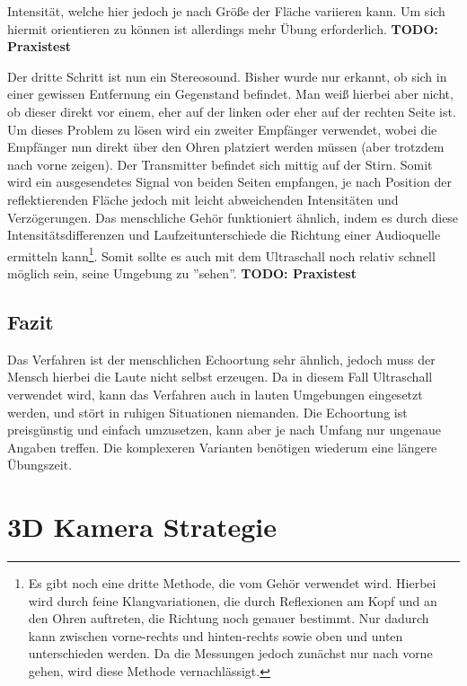 \documentclass[a4paper,12pt,ngerman]{scrartcl}
\begin{document}
Intensität, welche hier jedoch je nach Größe der Fläche variieren kann. Um sich hiermit 
orientieren zu können ist allerdings mehr Übung erforderlich. \textbf{TODO: Praxistest} \par
Der dritte Schritt ist nun ein Stereosound. Bisher wurde nur erkannt, ob sich in einer 
gewissen Entfernung ein Gegenstand befindet. Man weiß hierbei aber nicht, ob dieser direkt 
vor einem, eher auf der linken oder eher auf der rechten Seite ist. Um dieses Problem zu 
lösen wird ein zweiter Empfänger verwendet, wobei die Empfänger nun direkt über den Ohren 
platziert werden müssen (aber trotzdem nach vorne zeigen). Der Transmitter befindet sich 
mittig auf der Stirn. Somit wird ein ausgesendetes Signal von beiden Seiten empfangen, je 
nach Position der reflektierenden Fläche jedoch mit leicht abweichenden Intensitäten und 
Verzögerungen. Das menschliche Gehör funktioniert ähnlich, indem es durch diese 
Intensitätsdifferenzen und Laufzeitunterschiede die Richtung einer Audioquelle ermitteln 
kann\footnote{Es gibt noch eine dritte Methode, die vom Gehör verwendet wird. Hierbei wird 
durch feine Klangvariationen, die durch Reflexionen am Kopf und an den Ohren auftreten, die 
Richtung noch genauer bestimmt. Nur dadurch kann zwischen vorne-rechts und hinten-rechts 
sowie oben und unten unterschieden werden. Da die Messungen jedoch zunächst nur nach vorne 
gehen, wird diese Methode vernachlässigt.}. Somit sollte es auch mit dem Ultraschall noch 
relativ schnell möglich sein, seine Umgebung zu ''sehen''. \textbf{TODO: Praxistest}

\subsection{Fazit}

Das Verfahren ist der menschlichen Echoortung sehr ähnlich, jedoch muss der Mensch hierbei 
die Laute nicht selbst erzeugen. Da in diesem Fall Ultraschall verwendet wird, kann das 
Verfahren auch in lauten Umgebungen eingesetzt werden, und stört in ruhigen Situationen 
niemanden. Die Echoortung ist preisgünstig und einfach umzusetzen, kann aber je nach 
Umfang nur ungenaue Angaben treffen. Die komplexeren Varianten benötigen wiederum eine 
längere Übungszeit.

\newpage

\section{3D Kamera Strategie}
\end{document}
